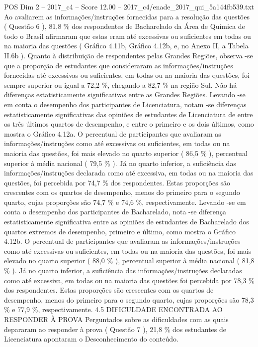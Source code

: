 \begin{textsample}{POS Dim 2 – 2017\_c4 – Score 12.00 – 2017\_c4/enade\_2017\_qui\_5a144fb539.txt}
Ao avaliarem as informações/instruções fornecidas para a resolução das questões ( Questão 6 ), 81,8 \% dos respondentes de Bacharelado da Área de Química de todo o Brasil afirmaram que estas eram até excessivas ou suficientes em todas ou na maioria das questões ( Gráfico 4.11b, Gráfico 4.12b, e, no Anexo II, a Tabela II.6b ).
Quanto à distribuição de respondentes pelas Grandes Regiões, observa -se que a proporção de estudantes que consideraram as informações/instruções fornecidas até excessivas ou suficientes, em todas ou na maioria das questões, foi sempre superior ou igual a 72,2 \%, chegando a 82,7 \% na região Sul.
Não há diferenças estatisticamente significativas entre as Grandes Regiões.
Levando -se em conta o desempenho dos participantes de Licenciatura, notam -se diferenças estatisticamente significativas das opiniões de estudantes de Licenciatura de entre os três últimos quartos de desempenho, e entre o primeiro e os dois últimos, como mostra o Gráfico 4.12a.
O percentual de participantes que avaliaram as informações/instruções como até excessivas ou suficientes, em todas ou na maioria das questões, foi mais elevado no quarto superior ( 86,5 \% ), percentual superior à média nacional ( 79,5 \% ).
Já no quarto inferior, a suficiência das informações/instruções declarada como até excessiva, em todas ou na maioria das questões, foi percebida por 74,7 \% dos respondentes.
Estas proporções são crescentes com os quartos de desempenho, menos do primeiro para o segundo quarto, cujas proporções são 74,7 \% e 74,6 \%, respectivamente.
Levando -se em conta o desempenho dos participantes de Bacharelado, nota -se diferença estatisticamente significativa entre as opiniões de estudantes de Bacharelado dos quartos extremos de desempenho, primeiro e último, como mostra o Gráfico 4.12b.
O percentual de participantes que avaliaram as informações/instruções como até excessivas ou suficientes, em todas ou na maioria das questões, foi mais elevado no quarto superior ( 88,0 \% ), percentual superior à média nacional ( 81,8 \% ).
Já no quarto inferior, a suficiência das informações/instruções declaradas como até excessiva, em todas ou na maioria das questões foi percebida por 78,3 \% dos respondentes.
Estas proporções são crescentes com os quartos de desempenho, menos do primeiro para o segundo quarto, cujas proporções são 78,3 \% e 77,9 \%, respectivamente. 4.5 DIFICULDADE ENCONTRADA AO RESPONDER À PROVA Perguntados sobre as dificuldades com as quais depararam ao responder à prova ( Questão 7 ), 21,8 \% dos estudantes de Licenciatura apontaram o Desconhecimento do conteúdo.

\end{textsample}
